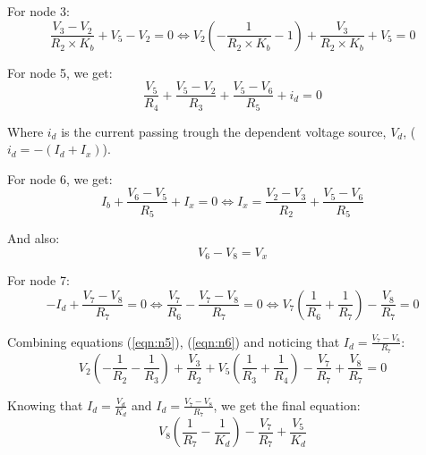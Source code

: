 For node 3:
\begin{equation}
\frac{V_3 - V_2}{R_2\times K_b }+ V_5 - V_2 = 0 \Leftrightarrow V_2 \left(-\frac{1}{R_2\times K_b} - 1\right) + \frac{V_3}{R_2\times K_b} + V_5 = 0
\end{equation}

For node 5, we get:
\begin{equation} \label{eqn:n5}
  \frac{V_5}{R_4}+ \frac{V_5-V_2}{R_3} + \frac{V_5-V_6}{R_5} + i_d= 0
\end{equation}

Where $i_d$ is the current passing trough the dependent voltage source, $V_d$, ($i_d = -(I_d + I_x)$).

For node 6, we get:
\begin{equation} \label{eqn:n6}
  I_b + \frac{V_6-V_5}{R_5} + I_x = 0 \Leftrightarrow I_x = \frac{V_2-V_3}{R_2} + \frac{V_5-V_6}{R_5}
\end{equation}

And also:
\begin{equation}
V_6-V_8 = V_x
\end{equation}

For node 7:
\begin{equation}
-I_d + \frac{V_7-V_8}{R_7} = 0 \Leftrightarrow \frac{V_7}{R_6} - \frac{V_7-V_8}{R_7} = 0\Leftrightarrow V_7\left(\frac{1}{R_6} + \frac{1}{R_7}\right) - \frac{V_8}{R_7} = 0
\end{equation}

Combining equations (\eqref{eqn:n5}), (\eqref{eqn:n6}) and noticing that $I_d = \frac{V_7-V_8}{R_7}$:
\begin{equation}
V_2 \left( -\frac{1}{R_2} - \frac{1}{R_3}\right) + \frac{V_3}{R_2} +  V_5 \left( \frac{1}{R_3} + \frac{1}{R_4}\right) - \frac{V_7}{R_7} + \frac{V_8}{R_7} = 0
\end{equation}

Knowing that $I_d = \frac{V_d}{K_d}$ and $I_d = \frac{V_7-V_8}{R_7}$, we get the final equation:
\begin{equation}
V_8\left( \frac{1}{R_7} - \frac{1}{K_d}\right) - \frac{V_7}{R_7} + \frac{V_5}{K_d}
\end{equation}


